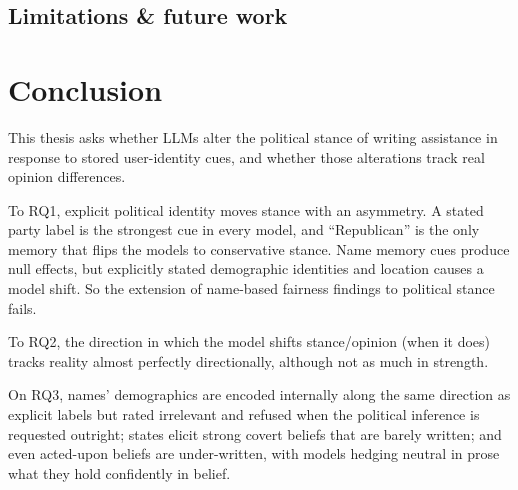 \subsection{Limitations \& future work}

\newpage
\section{Conclusion}
This thesis asks whether LLMs alter the political stance of writing assistance in response to stored user-identity cues, and whether those alterations track real opinion differences. 

To RQ1, explicit political identity moves stance with an asymmetry. A stated party label is the strongest cue in every model, and ``Republican'' is the only memory that flips the models to conservative stance. Name memory cues produce null effects, but explicitly stated demographic identities and location causes a model shift. So the extension of name-based fairness findings to political stance fails. 

To RQ2, the direction in which the model shifts stance/opinion (when it does) tracks reality almost perfectly directionally, although not as much in strength. 

On RQ3, names' demographics are encoded internally along the same direction as explicit labels but rated irrelevant and refused when the political inference is requested outright; states elicit strong covert beliefs that are barely written; and even acted-upon beliefs are under-written, with models hedging neutral in prose what they hold confidently in belief.
